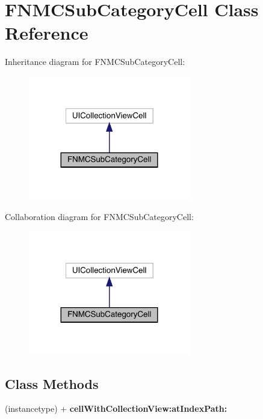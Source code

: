 \hypertarget{interface_f_n_m_c_sub_category_cell}{}\section{F\+N\+M\+C\+Sub\+Category\+Cell Class Reference}
\label{interface_f_n_m_c_sub_category_cell}


Inheritance diagram for F\+N\+M\+C\+Sub\+Category\+Cell\+:\nopagebreak
\begin{figure}[H]
\begin{center}
\leavevmode
\includegraphics[width=200pt]{interface_f_n_m_c_sub_category_cell__inherit__graph}
\end{center}
\end{figure}


Collaboration diagram for F\+N\+M\+C\+Sub\+Category\+Cell\+:\nopagebreak
\begin{figure}[H]
\begin{center}
\leavevmode
\includegraphics[width=200pt]{interface_f_n_m_c_sub_category_cell__coll__graph}
\end{center}
\end{figure}
\subsection*{Class Methods}
\begin{DoxyCompactItemize}
\item 
\mbox{\label{interface_f_n_m_c_sub_category_cell_af39e7903a9303e71f0b6ba93054fc4d6}} 
(instancetype) + {\bfseries cell\+With\+Collection\+View\+:at\+Index\+Path\+:}
\end{DoxyCompactItemize}
